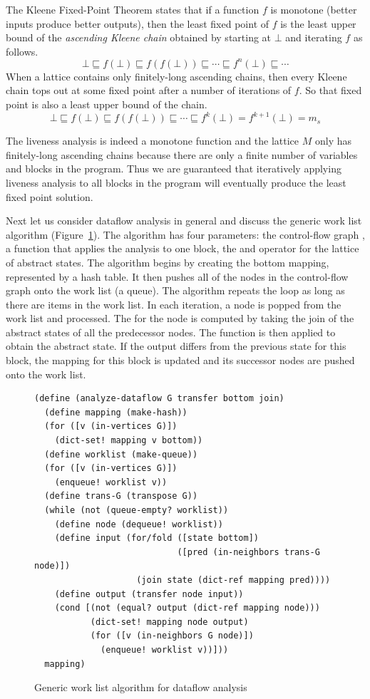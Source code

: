 \documentclass[11pt]{book}
\begin{document}
The Kleene Fixed-Point Theorem states that if a function $f$ is
monotone (better inputs produce better outputs), then the least fixed
point of $f$ is the least upper bound of the \emph{ascending Kleene
  chain} obtained by starting at $\bot$ and iterating $f$ as
follows.
\[
\bot \sqsubseteq f(\bot) \sqsubseteq f(f(\bot)) \sqsubseteq \cdots
  \sqsubseteq f^n(\bot) \sqsubseteq \cdots
\]
When a lattice contains only finitely-long ascending chains, then
every Kleene chain tops out at some fixed point after a number of
iterations of $f$. So that fixed point is also a least upper
bound of the chain.
\[
\bot \sqsubseteq f(\bot) \sqsubseteq f(f(\bot)) \sqsubseteq \cdots
\sqsubseteq f^k(\bot) = f^{k+1}(\bot) = m_s
\]

The liveness analysis is indeed a monotone function and the lattice
$M$ only has finitely-long ascending chains because there are only a
finite number of variables and blocks in the program. Thus we are
guaranteed that iteratively applying liveness analysis to all blocks
in the program will eventually produce the least fixed point solution.

Next let us consider dataflow analysis in general and discuss the
generic work list algorithm (Figure~\ref{fig:generic-dataflow}).
%
The algorithm has four parameters: the control-flow graph , a
function  that applies the analysis to one block, the
 and  operator for the lattice of abstract
states.  The algorithm begins by creating the bottom mapping,
represented by a hash table.  It then pushes all of the nodes in the
control-flow graph onto the work list (a queue). The algorithm repeats
the  loop as long as there are items in the work list. In
each iteration, a node is popped from the work list and processed. The
 for the node is computed by taking the join of the
abstract states of all the predecessor nodes. The 
function is then applied to obtain the  abstract
state. If the output differs from the previous state for this block,
the mapping for this block is updated and its successor nodes are
pushed onto the work list.

\begin{figure}[tb]
\begin{lstlisting}
(define (analyze-dataflow G transfer bottom join)
  (define mapping (make-hash))
  (for ([v (in-vertices G)])
    (dict-set! mapping v bottom))
  (define worklist (make-queue))
  (for ([v (in-vertices G)])
    (enqueue! worklist v))
  (define trans-G (transpose G))
  (while (not (queue-empty? worklist))
    (define node (dequeue! worklist)) 
    (define input (for/fold ([state bottom])
                            ([pred (in-neighbors trans-G node)])
                    (join state (dict-ref mapping pred))))
    (define output (transfer node input))
    (cond [(not (equal? output (dict-ref mapping node)))
           (dict-set! mapping node output)
           (for ([v (in-neighbors G node)])
             (enqueue! worklist v))]))
  mapping)
\end{lstlisting}
\caption{Generic work list algorithm for dataflow analysis}
  \label{fig:generic-dataflow}
\end{figure}
\end{document}
